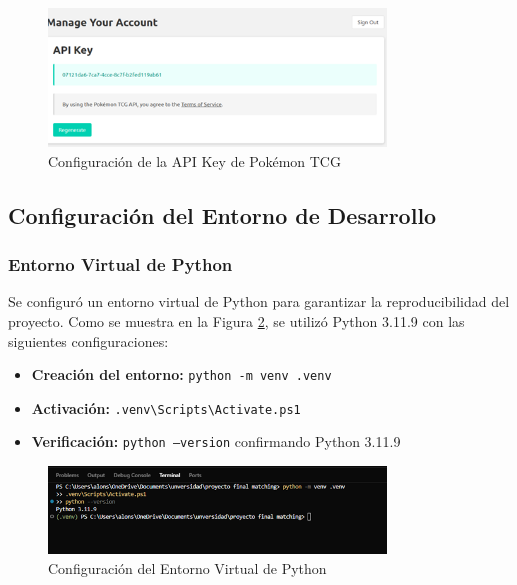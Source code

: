 \documentclass[12pt,letterpaper]{article}
\begin{document}
\begin{figure}[H]
\centering
\includegraphics[width=0.8\textwidth]{imagenes/Imagen3.png}
\caption{Configuración de la API Key de Pokémon TCG}
\label{fig:api_key_pokemon}
\end{figure}

\subsection{Configuración del Entorno de Desarrollo}

\subsubsection{Entorno Virtual de Python}

Se configuró un entorno virtual de Python para garantizar la reproducibilidad del proyecto. Como se muestra en la Figura \ref{fig:configuracion_entorno}, se utilizó Python 3.11.9 con las siguientes configuraciones:

\begin{itemize}
    \item \textbf{Creación del entorno:} \texttt{python -m venv .venv}
    \item \textbf{Activación:} \texttt{.venv\textbackslash Scripts\textbackslash Activate.ps1}
    \item \textbf{Verificación:} \texttt{python --version} confirmando Python 3.11.9
\end{itemize}

\begin{figure}[H]
\centering
\includegraphics[width=0.8\textwidth]{imagenes/Imagen1.png}
\caption{Configuración del Entorno Virtual de Python}
\label{fig:configuracion_entorno}
\end{figure}
\end{document}
